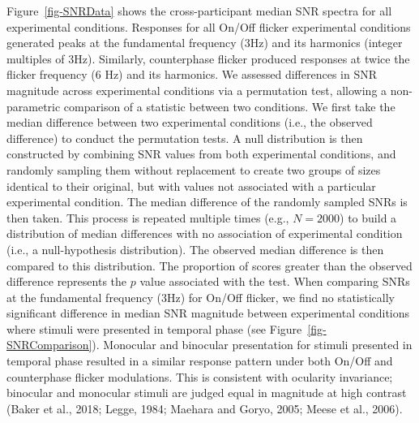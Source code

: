 \documentclass[
  12pt,
]{article}
\begin{document}
Figure~\ref{fig-SNRData} shows the cross-participant median SNR spectra
for all experimental conditions. Responses for all On/Off flicker
experimental conditions generated peaks at the fundamental frequency
(3Hz) and its harmonics (integer multiples of 3Hz). Similarly,
counterphase flicker produced responses at twice the flicker frequency
(6 Hz) and its harmonics. We assessed differences in SNR magnitude
across experimental conditions via a permutation test, allowing a
non-parametric comparison of a statistic between two conditions. We
first take the median difference between two experimental conditions
(i.e., the observed difference) to conduct the permutation tests. A null
distribution is then constructed by combining SNR values from both
experimental conditions, and randomly sampling them without replacement
to create two groups of sizes identical to their original, but with
values not associated with a particular experimental condition. The
median difference of the randomly sampled SNRs is then taken. This
process is repeated multiple times (e.g., \(N = 2000\)) to build a
distribution of median differences with no association of experimental
condition (i.e., a null-hypothesis distribution). The observed median
difference is then compared to this distribution. The proportion of
scores greater than the observed difference represents the \(p\) value
associated with the test. When comparing SNRs at the fundamental
frequency (3Hz) for On/Off flicker, we find no statistically significant
difference in median SNR magnitude between experimental conditions where
stimuli were presented in temporal phase (see
Figure~\ref{fig-SNRComparison}). Monocular and binocular presentation
for stimuli presented in temporal phase resulted in a similar response
pattern under both On/Off and counterphase flicker modulations. This is
consistent with ocularity invariance; binocular and monocular stimuli
are judged equal in magnitude at high contrast (Baker et al., 2018;
Legge, 1984; Maehara and Goryo, 2005; Meese et al., 2006).
\end{document}
